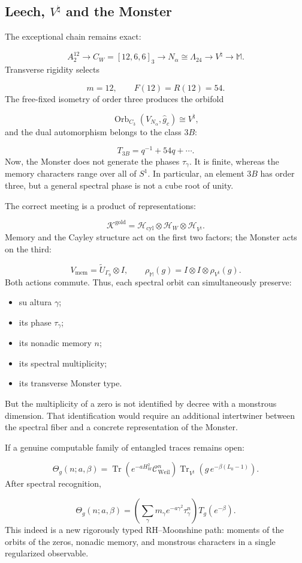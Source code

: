 \subsection{Leech, \(V^\natural\) and the Monster}
The exceptional chain remains exact:\par
\[
A_2^{12}
\longrightarrow
C_W=[12,6,6]_3
\longrightarrow
N_\alpha\cong\Lambda_{24}
\longrightarrow
V^\natural
\longrightarrow
\mathbb M.
\]
Transverse rigidity selects\par
\[
m=12,
\qquad
F(12)=R(12)=54.
\]
The free-fixed isometry of order three produces the orbifold\par
\[
\operatorname{Orb}_{C_3}
(V_{N_\alpha},\widehat g_c)
\cong V^\natural,
\]
and the dual automorphism belongs to the class \(3B\):\par
\[
T_{3B}
=
q^{-1}+54q+\cdots.
\]
Now, the Monster does not generate the phases \(\tau_\gamma\). It is finite, whereas the memory characters range over all of \(S^1\). In particular, an element \(3B\) has order three, but a general spectral phase is not a cube root of unity.\par
The correct meeting is a product of representations:\par
\[
\mathscr K^{\mathrm{gold}}
=
\mathscr H_{\mathrm{cyl}}
\otimes
\mathcal H_W
\otimes
\mathcal H_{V^\natural}.
\]
Memory and the Cayley structure act on the first two factors; the Monster acts on the third:\par
\[
V_{\mathrm{mem}}
=
\widetilde U_{\Gamma_9}\otimes I,
\qquad
\rho_{\mathbb M}(g)
=
I\otimes I\otimes\rho_{V^\natural}(g).
\]
Both actions commute. Thus, each spectral orbit can simultaneously preserve:\par
\begin{itemize}
\item su altura \(\gamma\);
\item its phase \(\tau_\gamma\);
\item its nonadic memory \(n\);
\item its spectral multiplicity;
\item its transverse Monster type.
\end{itemize}
But the multiplicity of a zero is not identified by decree with a monstrous dimension. That identification would require an additional intertwiner between the spectral fiber and a concrete representation of the Monster.\par
If a genuine computable family of entangled traces remains open:\par
\[
\Theta_g(n;a,\beta)
=
\operatorname{Tr}
\left(
e^{-aH_W^2}\mathcal C_{\mathrm{Weil}}^n
\right)
\operatorname{Tr}_{V^\natural}
\left(
g\,e^{-\beta(L_0-1)}
\right).
\]
After spectral recognition,\par
\[
\Theta_g(n;a,\beta)
=
\left(
\sum_\gamma
m_\gamma e^{-a\gamma^2}\tau_\gamma^n
\right)
T_g(e^{-\beta}).
\]
This indeed is a new rigorously typed RH–Moonshine path: moments of the orbits of the zeros, nonadic memory, and monstrous characters in a single regularized observable.\par
{}
